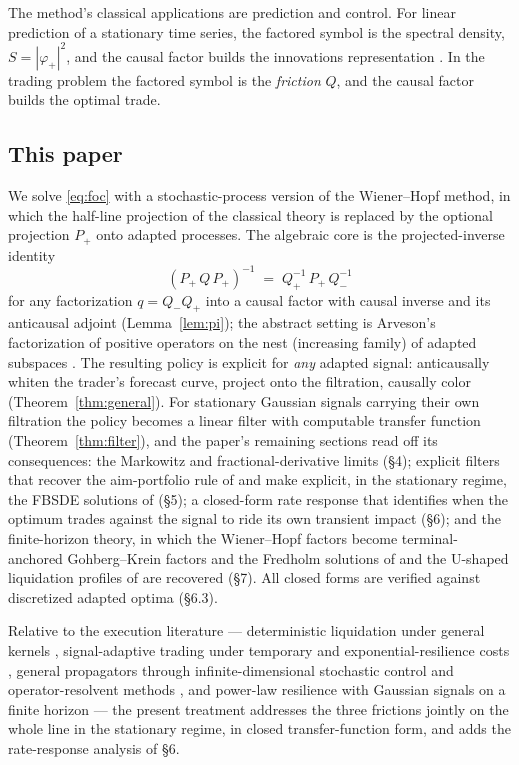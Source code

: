 \documentclass[11pt]{article}
\theoremstyle{plain}
\begin{document}
The method's classical applications are prediction and control. For linear prediction of a stationary time series, the factored symbol is the spectral density, $S = |\varphi_+|^2$, and the causal factor builds the innovations representation \citep{Wiener1949,Whittle1963}. In the trading problem the factored symbol is the \emph{friction} $Q$, and the causal factor builds the optimal trade.

\subsection{This paper}

We solve \eqref{eq:foc} with a stochastic-process version of the Wiener--Hopf method, in which the half-line projection of the classical theory is replaced by the optional projection $P_+$ onto adapted processes. The algebraic core is the projected-inverse identity
\begin{equation}\label{eq:pi-intro}
(P_+\,Q\,P_+)^{-1} \;=\; Q_+^{-1}\,P_+\,Q_-^{-1}
\end{equation}
for any factorization $q = Q_-Q_+$ into a causal factor with causal inverse and its anticausal adjoint (Lemma~\ref{lem:pi}); the abstract setting is Arveson's factorization of positive operators on the nest (increasing family) of adapted subspaces \citep{Arveson1975}. The resulting policy is explicit for \emph{any} adapted signal: anticausally whiten the trader's forecast curve, project onto the filtration, causally color (Theorem~\ref{thm:general}). For stationary Gaussian signals carrying their own filtration the policy becomes a linear filter with computable transfer function (Theorem~\ref{thm:filter}), and the paper's remaining sections read off its consequences: the Markowitz and fractional-derivative limits (\S4); explicit filters that recover the aim-portfolio rule of \citet{GarleanuPedersen2013,GarleanuPedersen2016} and make explicit, in the stationary regime, the FBSDE solutions of \citet{NeumanVoss2022} (\S5); a closed-form rate response that identifies when the optimum trades against the signal to ride its own transient impact (\S6); and the finite-horizon theory, in which the Wiener--Hopf factors become terminal-anchored Gohberg--Krein factors and the Fredholm solutions of \citet{FordeSanchezSmith2022} and the U-shaped liquidation profiles of \citet{GatheralSchiedSlynko2012} are recovered (\S7). All closed forms are verified against discretized adapted optima (\S6.3).

Relative to the execution literature --- deterministic liquidation under general kernels \citep{GatheralSchiedSlynko2012}, signal-adaptive trading under temporary and exponential-resilience costs \citep{LehalleNeuman2019,NeumanVoss2022,BankSonerVoss2017}, general propagators through infinite-dimensional stochastic control \citep{AbiJaberNeuman2025} and operator-resolvent methods \citep{AbiJaberNeumanTuschmann2024}, and power-law resilience with Gaussian signals on a finite horizon \citep{FordeSanchezSmith2022} --- the present treatment addresses the three frictions jointly on the whole line in the stationary regime, in closed transfer-function form, and adds the rate-response analysis of \S6.
\end{document}
